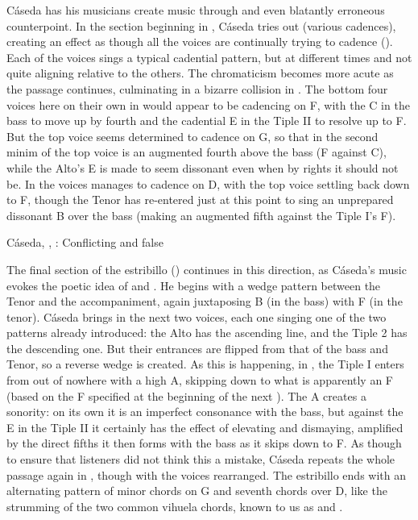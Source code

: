 Cáseda has his musicians create  music through 
and even blatantly erroneous counterpoint.
In the section beginning in , Cáseda tries out  (various cadences), creating an effect as though all the voices are  
continually trying to cadence ().
Each of the voices sings a typical cadential pattern, but at different times
and not quite aligning relative to the others.
The chromaticism becomes more acute as the passage continues, culminating in a
bizarre collision in .
The bottom four voices here on their own in  would appear to be
cadencing on F, with the C in the bass to move up by fourth and the cadential E
in the Tiple II to resolve up to F.
But the top voice seems determined to cadence on G, so that in the second minim
of  the top voice is an augmented fourth above the bass (F\sh{}
against C), while the Alto's E is made to seem dissonant even when by rights it
should not be.
In  the voices manages to cadence on D, with the top voice settling
back down to F\sh, though the Tenor has re-entered just at this point to sing
an unprepared dissonant B\fl{} over the bass (making an augmented fifth against
the Tiple I's F\sh).

{Cáseda, , : Conflicting
 and false }

The final section of the estribillo
() continues in this direction,
as Cáseda's music evokes the poetic idea of  and
.
He begins with a wedge pattern between the Tenor and the accompaniment, again
juxtaposing B\fl{} (in the bass) with F\sh{} (in the tenor).
Cáseda brings in the next two voices, each one singing one of the two patterns
already introduced: the Alto has the ascending line, and the Tiple 2 has the
descending one.
But their entrances are flipped from that of the bass and Tenor, so a reverse
wedge is created.
As this is happening, in , the Tiple I enters from out of nowhere
with a high A, skipping down to what is apparently an F\na{} (based on the
F\sh{} specified at the beginning of the next ).
The A creates a  sonority: on its own it is an imperfect
consonance with the bass, but against the E\fl{} in the Tiple II it certainly
has the effect of elevating and dismaying, amplified by the direct fifths it
then forms with the bass as it skips down to F.
As though to ensure that listeners did not think this a mistake, Cáseda repeats
the whole passage again in , though with the voices rearranged.
The estribillo ends with an alternating pattern of minor chords on G and
seventh chords over D, like the strumming of the two common vihuela chords,
known to us as  and .


